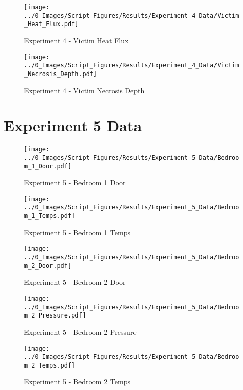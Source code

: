 	\begin{figure}[H]
		\centering
		\texttt{[image: ../0\_Images/Script\_Figures/Results/Experiment\_4\_Data/Victim\_Heat\_Flux.pdf]}
		\caption[]{Experiment 4 - Victim Heat Flux}
	\end{figure}
 
	\clearpage

	\begin{figure}[H]
		\centering
		\texttt{[image: ../0\_Images/Script\_Figures/Results/Experiment\_4\_Data/Victim\_Necrosis\_Depth.pdf]}
		\caption[]{Experiment 4 - Victim Necrosis Depth}
	\end{figure}
 

\clearpage		\large
\section{Experiment 5 Data} \label{App:Exp5Results} 

	\begin{figure}[H]
		\centering
		\texttt{[image: ../0\_Images/Script\_Figures/Results/Experiment\_5\_Data/Bedroom\_1\_Door.pdf]}
		\caption[]{Experiment 5 - Bedroom 1 Door}
	\end{figure}
 

	\begin{figure}[H]
		\centering
		\texttt{[image: ../0\_Images/Script\_Figures/Results/Experiment\_5\_Data/Bedroom\_1\_Temps.pdf]}
		\caption[]{Experiment 5 - Bedroom 1 Temps}
	\end{figure}
 
	\clearpage

	\begin{figure}[H]
		\centering
		\texttt{[image: ../0\_Images/Script\_Figures/Results/Experiment\_5\_Data/Bedroom\_2\_Door.pdf]}
		\caption[]{Experiment 5 - Bedroom 2 Door}
	\end{figure}
 

	\begin{figure}[H]
		\centering
		\texttt{[image: ../0\_Images/Script\_Figures/Results/Experiment\_5\_Data/Bedroom\_2\_Pressure.pdf]}
		\caption[]{Experiment 5 - Bedroom 2 Pressure}
	\end{figure}
 
	\clearpage

	\begin{figure}[H]
		\centering
		\texttt{[image: ../0\_Images/Script\_Figures/Results/Experiment\_5\_Data/Bedroom\_2\_Temps.pdf]}
		\caption[]{Experiment 5 - Bedroom 2 Temps}
	\end{figure}
 

